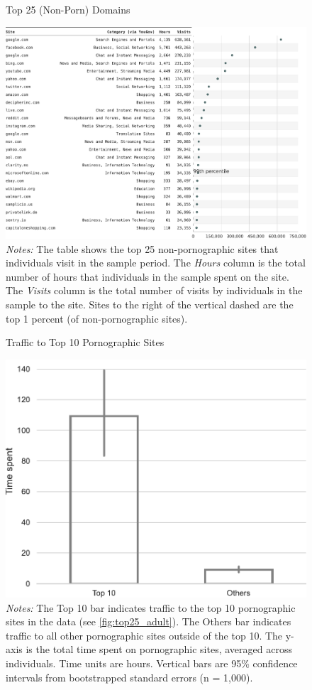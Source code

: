 \documentclass[12pt, letterpaper]{article}
\begin{document}
\begin{figure}
	\centering
	\caption{Top 25 (Non-Porn) Domains}
	\includegraphics[width=\textwidth]{figs/top_25_nonadultsites.pdf}
	\caption*{\footnotesize \emph{Notes:} 
		The table shows the top 25 non-pornographic sites that individuals visit in the sample period.
		The \emph{Hours} column is the total number of hours that individuals in the sample spent on the site. 
		The \emph{Visits} column is the total number of visits by individuals in the sample to the site.  			
		Sites to the right of the vertical dashed are the top 1 percent (of non-pornographic sites).
	}
	\label{fig:top25_nonadult}
\end{figure}


\begin{figure}
	\centering
	\caption{Traffic to Top 10 Pornographic Sites}
	\includegraphics[width=.5\textwidth]{figs/concentration_porn_consumption.pdf}
	\caption*{\footnotesize \emph{Notes:} 
		The Top 10 bar indicates traffic to the top 10 pornographic sites in the data (see \cref{fig:top25_adult}).
		The Others bar indicates traffic to all other pornographic sites outside of the top 10.
		The y-axis is the total time spent on pornographic sites, averaged across individuals.
		Time units are hours.
		Vertical bars are 95\% confidence intervals from bootstrapped standard errors (n = 1,000).
	}
	\label{fig:concentration_porn_consumption}
\end{figure}
\end{document}
